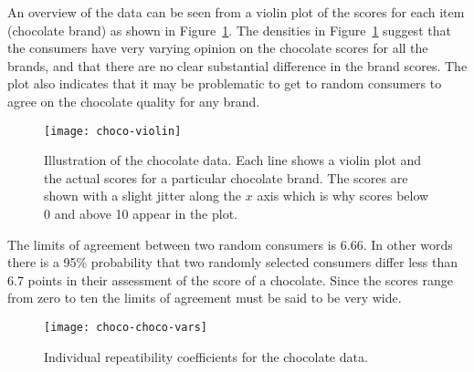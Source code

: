 \documentclass[aoas]{imsart}
\makeatletter
\newcommand{\code}[1]{\texttt{#1}\@\xspace}
\makeatother
\begin{document}
An overview of the data can be seen from a violin plot of the scores
for each item (chocolate brand) as shown in
Figure~\ref{fig:choco-violin}.  The densities in
Figure~\ref{fig:choco-violin} suggest that the consumers have very
varying opinion on the chocolate scores for all the brands, and that
there are no clear substantial difference in the brand scores. The
plot also indicates that it may be problematic to get to random
consumers to agree on the chocolate quality for any brand.


\begin{figure}%
  \centering
\texttt{[image: choco-violin]}
\caption{Illustration of the chocolate data. Each line shows a violin
  plot and the actual scores for a particular chocolate brand. The
  scores are shown with a slight jitter along the $x$ axis which is
  why scores below 0 and above 10 appear in the plot.}
\label{fig:choco-violin}
\end{figure}



The limits of agreement between two random consumers is
6.66. In other words there is a
95\% probability that two randomly selected consumers differ less than
6.7 points in their assessment
of the score of a chocolate. Since the scores range from zero to ten
the limits of agreement must be said to be very wide.




\begin{figure}%
  \centering
\texttt{[image: choco-choco-vars]}
\caption{Individual repeatibility coefficients for the chocolate data.}
\label{fig:choco-vars}
\end{figure}
\end{document}
